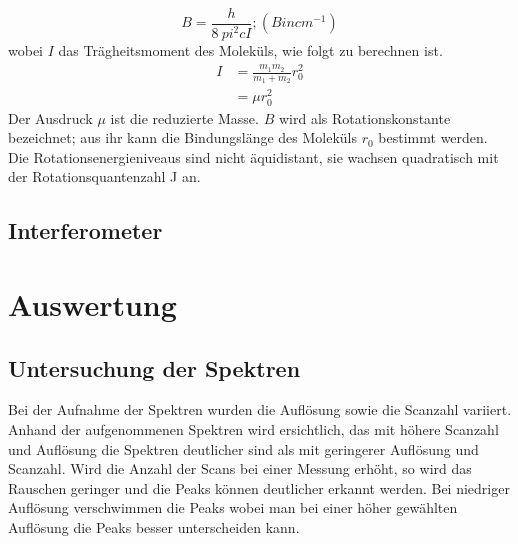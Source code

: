 \documentclass{article}
\begin{document}
\begin{equation}
\label{eq:bconst}
B = \frac{h}{8 \ pi ^2 c I} ; (B in cm^{-1})  
\end{equation}
wobei $I$ das Trägheitsmoment des Moleküls, 
wie folgt zu berechnen ist.
\begin{align}
\label{eq:trag}
I &=\frac{m_1 m_2 }{m_1 + m_2} r_0^2\\
&=\mu r_0^2
\end{align}
Der Ausdruck $\mu$ ist die reduzierte Masse.
$B$ wird als Rotationskonstante bezeichnet; aus ihr kann die Bindungslänge des Moleküls
$r_0$ bestimmt werden. Die Rotationsenergieniveaus sind nicht äquidistant, sie
wachsen quadratisch mit der Rotationsquantenzahl J an.

\subsection{Interferometer}

\section{Auswertung}

\subsection{Untersuchung der Spektren}

Bei der Aufnahme der Spektren wurden die Auflösung sowie die Scanzahl variiert. Anhand der aufgenommenen Spektren wird ersichtlich, das mit höhere Scanzahl und Auflösung die Spektren deutlicher sind als mit geringerer Auflösung und Scanzahl. 
Wird die Anzahl der Scans bei einer Messung erhöht, so wird das Rauschen geringer und die Peaks können deutlicher erkannt werden. Bei niedriger Auflösung verschwimmen die Peaks wobei man bei einer höher gewählten Auflösung die Peaks besser unterscheiden kann.
\end{document}
